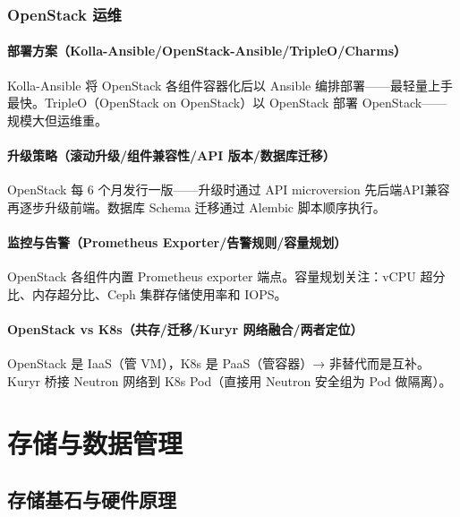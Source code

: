 \documentclass[12pt,UTF8]{ctexbook}
\begin{document}
  \section{OpenStack 运维}
    \subsection{部署方案（Kolla-Ansible/OpenStack-Ansible/TripleO/Charms）}

Kolla-Ansible 将 OpenStack 各组件容器化后以 Ansible 编排部署——最轻量上手最快。TripleO（OpenStack on OpenStack）以 OpenStack 部署 OpenStack——规模大但运维重。

    \subsection{升级策略（滚动升级/组件兼容性/API 版本/数据库迁移）}

OpenStack 每 6 个月发行一版——升级时通过 API microversion 先后端API兼容再逐步升级前端。数据库 Schema 迁移通过 Alembic 脚本顺序执行。

    \subsection{监控与告警（Prometheus Exporter/告警规则/容量规划）}

OpenStack 各组件内置 Prometheus exporter 端点。容量规划关注：vCPU 超分比、内存超分比、Ceph 集群存储使用率和 IOPS。

    \subsection{OpenStack vs K8s（共存/迁移/Kuryr 网络融合/两者定位）}

OpenStack 是 IaaS（管 VM），K8s 是 PaaS（管容器）→ 非替代而是互补。Kuryr 桥接 Neutron 网络到 K8s Pod（直接用 Neutron 安全组为 Pod 做隔离）。


\part{存储与数据管理}

\chapter{存储基石与硬件原理}
\end{document}
